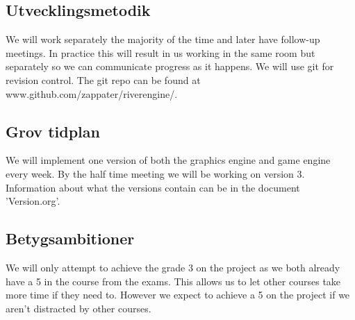 \documentclass[12pt,a4paper]{article}
\begin{document}
\subsection{Utvecklingsmetodik}

We will work separately the majority of the time and later have follow-up meetings. In practice this will result in us working in the same room but separately so we can communicate progress as it happens.
We will use git for revision control. The git repo can be found at www.github.com/zappater/riverengine/.


\subsection{Grov tidplan}

We will implement one version of both the graphics engine and game engine every week. By the half time meeting we will be working on version 3. Information about what the versions contain can be in the document 'Version.org'.


\subsection{Betygsambitioner}

We will only attempt to achieve the grade 3 on the project as we both already have a 5 in the course from the exams. This allows us to let other courses take more time if they need to.
However we expect to achieve a 5 on the project if we aren't distracted by other courses.
\end{document}
